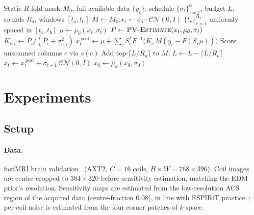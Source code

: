 \documentclass[conference]{IEEEtran}
\newcommand{\xz}{x_0}
\newcommand{\xt}{x_t}
\newcommand{\sigt}{\sigma_t}
\begin{document}
\begin{algorithm}[t]
\caption{\textsc{PVAS}: PV-gated multi-coil sampler with active acquisition}
\label{alg:active}
\begin{algorithmic}[1]
\Require Static $R$-fold mask $M_0$, full available data $\{y_c\}$,
         schedule $\{\sigt\}_{t=T}^{0}$, budget $L$, rounds $R_a$,
         windows $[t_{\text{a}}, t_{\text{b}}]$
\State $M \gets M_0$;\quad $\xt \gets \sigma_T \cdot \mathcal{CN}(0,I)$
\State $\{t_r\}_{r=1}^{R_a}$ uniformly spaced in $[t_{\text{a}}, t_{\text{b}}]$
  \State $\mu \gets \mu_\theta(\xt, \sigt)$
  \State $P \gets \textsc{PV-Estimate}(\xt, \mu_\theta, \sigt)$
  \State $K_{c,i} \gets P_i / (P_i + \sigma_{c,i}^{2})$ 
  \State $\xt^{\,\text{post}} \gets \mu + \sum_c S_c^{*} F^{-1}\!\bigl(K_c\, M (y_c - F(S_c \mu))\bigr)$
    \State Score unscanned columns $c$ via $s(c)$ 
    \State Add top-$\lceil L/R_a \rceil$ to $M$;\quad
           $L \gets L - \lceil L/R_a \rceil$
  \EndIf
  \State $\xt \gets \xt^{\,\text{post}} + \sigma_{t-1}\,\mathcal{CN}(0,I)$
\EndFor
\State \Return $\xz \gets \mu_\theta(x_0,\sigma_0)$
\end{algorithmic}
\end{algorithm}

\section{Experiments}\label{sec:exp}

\subsection{Setup}\label{sec:setup}

\paragraph{Data.} fastMRI brain validation~\cite{zbontar2018fastmri}
(AXT2, $C{=}16$ coils, $H{\times}W{=}768{\times}396$). Coil images
are centre-cropped to $384{\times}320$ before sensitivity estimation,
matching the EDM prior's resolution. Sensitivity maps are estimated
from the low-resolution ACS region of the acquired data
(centre-fraction $0.08$), in line with ESPIRiT
practice~\cite{uecker2014espirit}; per-coil noise is estimated from
the four corner patches of $k$-space.
\end{document}
